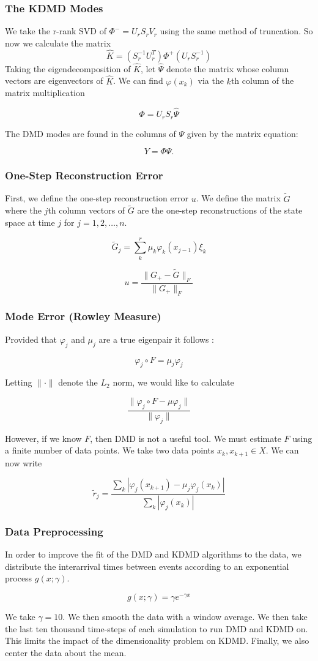 \documentclass{beamer}
\begin{document}
\begin{frame}
    \frametitle{The KDMD Modes}
    We take the r-rank SVD of $\Phi^{-}=U_r S_r V_r$ using the same method of truncation.
     So now we calculate the matrix
    $$
    {\hat K} = (S^{-1}_r U^T_r)\Phi^{+}(U_r S^{-1}_r)
    $$
    Taking the eigendecomposition of $\hat K$, let $\hat \Psi$ denote the matrix
    whose column vectors are eigenvectors of ${\hat K}$.
    We can find $\varphi(x_k)$ via the $k$th column of the matrix multiplication 

    $$
        \varPhi = U_r S_r {\hat \Psi}
    $$

    The DMD modes are found in the columns of $\Psi$ given by the matrix equation:

    $$
    Y = \varPhi \Psi.
    $$
\end{frame}

\begin{frame}
    \frametitle{One-Step Reconstruction Error}
    First, we define the one-step reconstruction
    error $u$. We define the matrix ${\tilde G}$ where the $j$th column vectors of ${\tilde G}$ are the one-step
    reconstructions of the state space at time $j$ for $j=1,2,\dots, n$.
    
    $$
    {\tilde G}_{j} = \sum^{r}_{k} \mu_k \varphi_k(x_{j-1}) \xi_k
    $$
    
    $$
    u = \frac{\|G_{+} - {\tilde G} \|_F}{\|G_{+}\|_F}
    $$
\end{frame}

\begin{frame}
    \frametitle{Mode Error (Rowley Measure)}
    Provided that $\varphi_j$ and $\mu_j$ are
a true eigenpair it follows \cite{zhang2017evaluating}:

$$
\varphi_j \circ F = \mu_j \varphi_j
$$

\noindent Letting $\|\cdot\|$ denote the $L_2$ norm, we would like to calculate 

$$
\frac{\| \varphi_j \circ F - \mu \varphi_j \|}{\| \varphi_j \|}
$$

\noindent However, if we know $F$, then DMD is not a useful tool.
We must estimate $F$ using a finite number of data points. We take
two data points $x_k, x_{k+1} \in X$. We can now write 

$$
{\tilde r}_{j} = \frac{\sum_{k} |\varphi_j(x_{k+1}) - \mu_j \varphi_j(x_{k})|}{\sum_{k} |\varphi_j(x_k )|}
$$

\end{frame}

\begin{frame}
\frametitle{Data Preprocessing}
In order to improve the fit of the DMD and KDMD algorithms to the data, we distribute the interarrival times between events according
to an exponential process $g(x;\gamma)$.

$$
g(x;\gamma) = \gamma e^{ - \gamma x}
$$

\vspace{3mm}
We take $\gamma=10$. We then smooth the data with a window average. We then take the last ten thousand time-steps of each simulation to run DMD and KDMD on. 
This limits the impact of the dimensionality problem on KDMD. Finally, we also center the data about the mean.
\end{frame}
\end{document}
